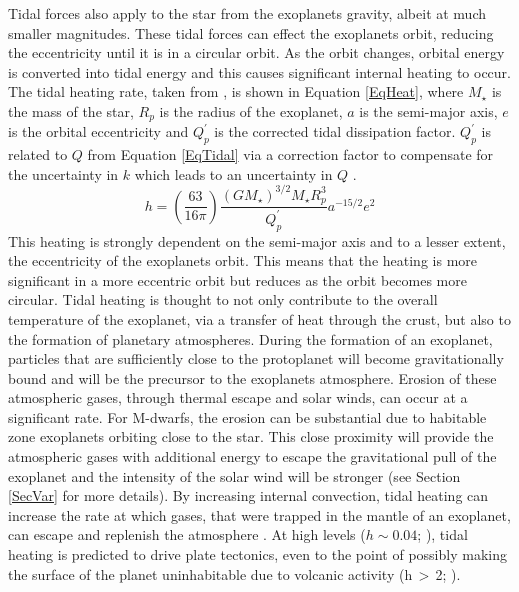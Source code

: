 Tidal forces also apply to the star from the exoplanets gravity, albeit at much smaller magnitudes. These tidal forces can effect the exoplanets orbit, reducing the eccentricity until it is in a circular orbit. As the orbit changes, orbital energy is converted into tidal energy and this causes significant internal heating to occur. The tidal heating rate, taken from \citep{2008Jackson}, is shown in Equation \ref{EqHeat}, where $M_\star$ is the mass of the star, $R_p$ is the radius of the exoplanet, $a$ is the semi-major axis, $e$ is the orbital eccentricity and $Q_p^\prime$ is the corrected tidal dissipation factor. $Q_p^\prime$ is related to $Q$ from Equation \ref{EqTidal} via a correction factor to compensate for the uncertainty in $k$ which leads to an uncertainty in $Q$ \citep{2008Jackson2,1966Goldreich}.\\
\begin{equation}
h = \left(\frac{63}{16\pi}\right) \frac{(GM_\star)^{3/2} M_\star R_p^3}{Q_p^\prime} a^{-15/2} e^2 
\label{EqHeat}
\end{equation}
This heating is strongly dependent on the semi-major axis and to a lesser extent, the eccentricity of the exoplanets orbit. This means that the heating is more significant in a more eccentric orbit but reduces as the orbit becomes more circular. Tidal heating is thought to not only contribute to the overall temperature of the exoplanet, via a transfer of heat through the crust, but also to the formation of planetary atmospheres. During the formation of an exoplanet, particles that are sufficiently close to the protoplanet will become gravitationally bound and will be the precursor to the exoplanets atmosphere. Erosion of these atmospheric gases, through thermal escape and solar winds, can occur at a significant rate. For M-dwarfs, the erosion can be substantial due to habitable zone exoplanets orbiting close to the star. This close proximity will provide the atmospheric gases with additional energy to escape the gravitational pull of the exoplanet and the intensity of the solar wind will be stronger (see Section \ref{SecVar} for more details). By increasing internal convection, tidal heating can increase the rate at which gases, that were trapped in the mantle of an exoplanet, can escape and replenish the atmosphere \citep{2011Perryman}. At high levels ($h\sim0.04$; \citealt{2008Jackson}), tidal heating is predicted to drive plate tectonics, even to the point of possibly making the surface of the planet uninhabitable due to volcanic activity (h\,$>$\,2; \citealt{2008Jackson}).\\

